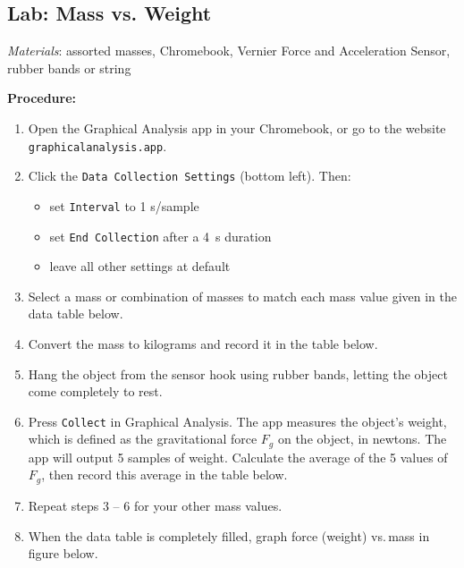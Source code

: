 \documentclass[]{exam}
\theoremstyle{definition}
\begin{document}
\clearpage


\subsection*{Lab: Mass vs. Weight}




\textit{Materials}: assorted masses, Chromebook, Vernier Force and Acceleration Sensor, rubber bands or string

\medskip

\textbf{Procedure:}

\begin{enumerate}[itemsep=0pt,topsep=2pt]
    \item Open the Graphical Analysis app in your Chromebook, or go to the website \texttt{graphicalanalysis.app}.
    \item Click the \texttt{Data Collection Settings} (bottom left). Then: 
    \begin{itemize}[itemsep=0pt,topsep=0pt]
        \item set \texttt{Interval} to 1 s/sample
        \item set \texttt{End Collection} after a \SI{4}{s} duration
        \item leave all other settings at default
    \end{itemize}
    \item Select a mass or combination of masses to match each mass value given in the data table below.
    \item Convert the mass to kilograms and record it in the table below.
    \item Hang the object from the sensor hook using rubber bands, letting the object come completely to rest. 
    \item Press \texttt{Collect} in Graphical Analysis. The app measures the object's weight, which is defined as the gravitational force $F_g$ on the object, in newtons. The app will output 5 samples of weight. Calculate the average of the 5 values of $F_g$, then record this average in the table below.
    \item Repeat steps 3 -- 6 for your other mass values.
    \item When the data table is completely filled, graph force (weight) vs.\,mass in figure below.
\end{enumerate}
\end{document}
